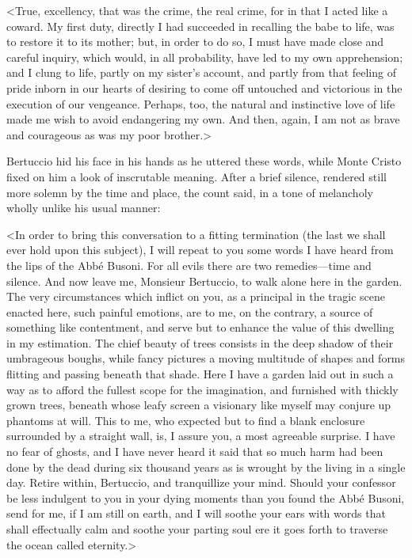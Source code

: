  <True, excellency, that was the crime, the real crime, for in that I acted like a coward. My first duty, directly I had succeeded in recalling the babe to life, was to restore it to its mother; but, in order to do so, I must have made close and careful inquiry, which would, in all probability, have led to my own apprehension; and I clung to life, partly on my sister's account, and partly from that feeling of pride inborn in our hearts of desiring to come off untouched and victorious in the execution of our vengeance. Perhaps, too, the natural and instinctive love of life made me wish to avoid endangering my own. And then, again, I am not as brave and courageous as was my poor brother.> 

 Bertuccio hid his face in his hands as he uttered these words, while Monte Cristo fixed on him a look of inscrutable meaning. After a brief silence, rendered still more solemn by the time and place, the count said, in a tone of melancholy wholly unlike his usual manner: 

 <In order to bring this conversation to a fitting termination (the last we shall ever hold upon this subject), I will repeat to you some words I have heard from the lips of the Abbé Busoni. For all evils there are two remedies—time and silence. And now leave me, Monsieur Bertuccio, to walk alone here in the garden. The very circumstances which inflict on you, as a principal in the tragic scene enacted here, such painful emotions, are to me, on the contrary, a source of something like contentment, and serve but to enhance the value of this dwelling in my estimation. The chief beauty of trees consists in the deep shadow of their umbrageous boughs, while fancy pictures a moving multitude of shapes and forms flitting and passing beneath that shade. Here I have a garden laid out in such a way as to afford the fullest scope for the imagination, and furnished with thickly grown trees, beneath whose leafy screen a visionary like myself may conjure up phantoms at will. This to me, who expected but to find a blank enclosure surrounded by a straight wall, is, I assure you, a most agreeable surprise. I have no fear of ghosts, and I have never heard it said that so much harm had been done by the dead during six thousand years as is wrought by the living in a single day. Retire within, Bertuccio, and tranquillize your mind. Should your confessor be less indulgent to you in your dying moments than you found the Abbé Busoni, send for me, if I am still on earth, and I will soothe your ears with words that shall effectually calm and soothe your parting soul ere it goes forth to traverse the ocean called eternity.> 

